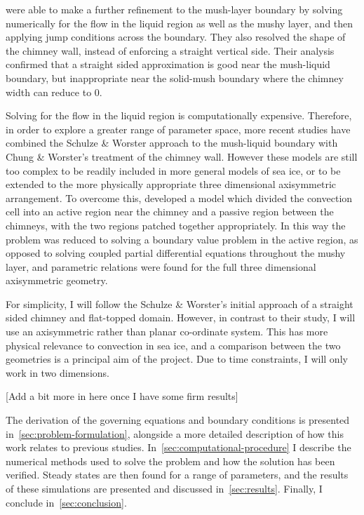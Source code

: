 \documentclass[11pt]{proc}
\begin{document}
\citet*{chung-worster-02} were able to make a further refinement to the mush-layer boundary by solving numerically for the flow in the liquid region as well as the mushy layer, and then applying jump conditions across the boundary. They also resolved the shape of the chimney wall, instead of enforcing a straight vertical side. Their analysis confirmed that a straight sided approximation is good near the mush-liquid boundary, but inappropriate near the solid-mush boundary where the chimney width can reduce to $0$.

Solving for the flow in the liquid region is computationally expensive. Therefore, in order to explore a greater range of parameter space, more recent studies \citep*{wells-et-al-10, wells-et-al-13} have combined the Schulze \& Worster approach to the mush-liquid boundary with Chung \& Worster's treatment of the chimney wall. However these models are still too complex to be readily included in more general models of sea ice, or to be extended to the more physically appropriate three dimensional axisymmetric arrangement. To overcome this, \citet*{rees-jones-worster-13} developed a model which divided the convection cell into an active region near the chimney and a passive region between the chimneys, with the two regions patched together appropriately. In this way the problem was reduced to solving a boundary value problem in the active region, as opposed to solving coupled partial differential equations throughout the mushy layer, and parametric relations were found for the full three dimensional axisymmetric geometry.

For simplicity, I will follow the Schulze \& Worster's initial approach of a straight sided chimney and flat-topped domain. However, in contrast to their study, I will use an axisymmetric rather than planar co-ordinate system. This has more physical relevance to convection in sea ice, and a comparison between the two geometries is a principal aim of the project. Due to time constraints, I will only work in two dimensions.

[Add a bit more in here once I have some firm results]

The derivation of the governing equations and boundary conditions is presented in~\autoref{sec:problem-formulation}, alongside a more detailed description of how this work relates to previous studies. In~\autoref{sec:computational-procedure} I describe the numerical methods used to solve the problem and how the solution has been verified. Steady states are then found for a range of parameters, and the results of these simulations are presented and discussed in~\autoref{sec:results}. Finally, I conclude in~\autoref{sec:conclusion}.
\end{document}
